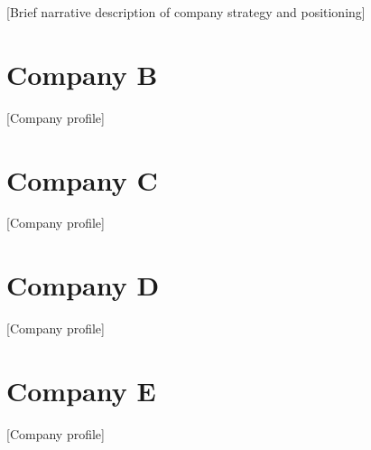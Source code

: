 \documentclass[11pt,letterpaper]{report}
\begin{document}
[Brief narrative description of company strategy and positioning]

\section{Company B}
[Company profile]

\section{Company C}
[Company profile]

\section{Company D}
[Company profile]

\section{Company E}
[Company profile]

\newpage



% 
% 
%

\end{document}
